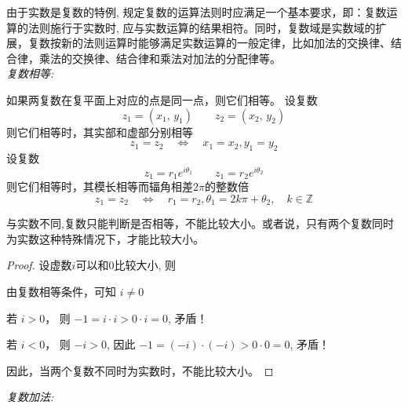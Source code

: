 由于实数是复数的特例, 规定复数的运算法则时应满足一个基本要求，即：复数运算的法则施行于实数时, 应与实数运算的结果相符。同时，复数域是实数域的扩展，复数按新的法则运算时能够满足实数运算的一般定律，比如加法的交换律、结合律，乘法的交换律、结合律和乘法对加法的分配律等。\\

\noindent \emph{复数相等: } 

如果两复数在复平面上对应的点是同一点，则它们相等。
设复数
\[z_1 = (x_1,\, y_1) \qquad z_2=(x_2,\,y_2) \]
则它们相等时，其实部和虚部分别相等
\begin{equation}\label{} 
    {z}_{1}={z}_{2} \quad \Leftrightarrow \quad x_{1}=x_{2}, y_{1}=y_2
\end{equation}
设复数
\[z_1 = r_1 e^{i \theta_1} \qquad z_1 = r_2 e^{i \theta_2} \]
则它们相等时，其模长相等而辐角相差$2\pi$的整数倍
\begin{equation}\label{}
    {z}_{1}= {z}_{2} \quad  \Leftrightarrow \quad  r_1= r_2, \theta_1=2k \pi + \theta_2, \quad k \in \mathbb{Z}   
\end{equation}

\begin{proposition}\label{}
	与实数不同,复数只能判断是否相等，不能比较大小。或者说，只有两个复数同时为实数这种特殊情况下，才能比较大小。
\end{proposition}
\begin{proof}
	设虚数$i$可以和$0$比较大小, 则
\begin{compactitem}
   \item 由复数相等条件，可知 $i \ne 0$
   \item 若 $i>0$， 则 $ -1 = i\cdot i >  0 \cdot i  =0$, 矛盾！
   \item 若 $i<0$， 则 $-i> 0$, 因此 $ -1 = (-i)\cdot (-i) >  0 \cdot 0  =0$, 矛盾！
\end{compactitem}
因此，当两个复数不同时为实数时，不能比较大小。 
\end{proof}

\noindent \emph{复数加法: } 


